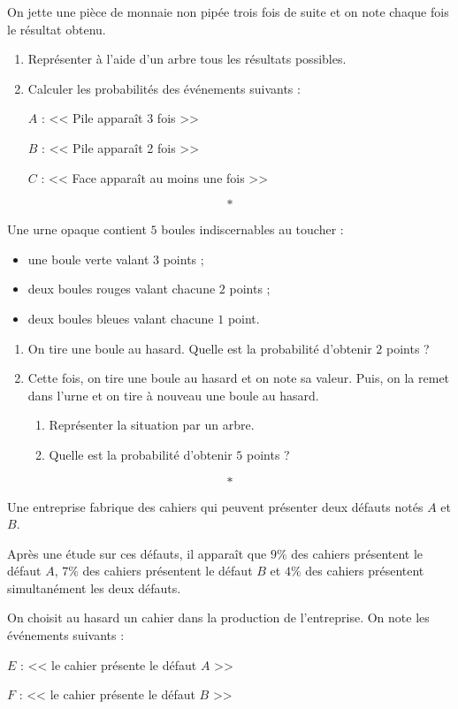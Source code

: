 \documentclass[11pt,openright,twoside,french]{book}
\begin{document}
\exo On jette une pièce de monnaie non pipée trois fois de suite et on note chaque fois le résultat obtenu.
    \begin{enumerate}
        \item Représenter à l'aide d'un arbre tous les résultats possibles.
        \item Calculer les probabilités des événements suivants :\par
        $A$ : << Pile apparaît 3 fois >>\par
        $B$ : << Pile apparaît 2 fois >>\par
        $C$ : << Face apparaît au moins une fois >>
    \end{enumerate}\[*\]\clearpage
    
\exo Une urne opaque contient $5$ boules indiscernables au toucher :\par
\begin{itemize}
    \item une boule verte valant $3$ points ;
    \item deux boules rouges valant chacune $2$ points ;
    \item deux boules bleues valant chacune $1$ point.
\end{itemize}

\begin{enumerate}
    \item On tire une boule au hasard. Quelle est la probabilité d'obtenir $2$ points ?
    \item Cette fois, on tire une boule au hasard et on note sa valeur. Puis, on la remet dans l'urne et on tire à nouveau une boule au hasard.
        \begin{enumerate}
            \item Représenter la situation par un arbre.
            \item Quelle est la probabilité d'obtenir $5$ points ?
        \end{enumerate}
\end{enumerate}\[*\]

\exo Une entreprise fabrique des cahiers qui peuvent présenter deux défauts notés $A$ et $B$.\par
Après une étude sur ces défauts, il apparaît que $9\%$ des cahiers présentent le défaut $A$, $7\%$ des cahiers présentent le défaut $B$ et $4\%$ des cahiers présentent simultanément les deux défauts.\par
On choisit au hasard un cahier dans la production de l'entreprise. On note les événements suivants :\par
$E$ : << le cahier présente le défaut $A$ >>\par
$F$ : << le cahier présente le défaut $B$ >>
\end{document}
